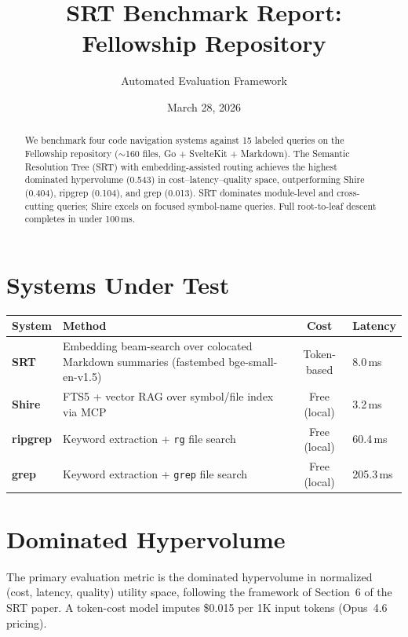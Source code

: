 \documentclass[11pt,a4paper]{article}
\title{\textbf{SRT Benchmark Report: Fellowship Repository}}
\author{Automated Evaluation Framework}
\date{March 28, 2026}
\begin{document}
\maketitle

\begin{abstract}
We benchmark four code navigation systems against 15 labeled queries on the Fellowship repository ($\sim$160 files, Go + SvelteKit + Markdown).
The Semantic Resolution Tree (SRT) with embedding-assisted routing achieves the highest dominated hypervolume (0.543) in cost--latency--quality space, outperforming Shire (0.404), ripgrep (0.104), and grep (0.013).
SRT dominates module-level and cross-cutting queries; Shire excels on focused symbol-name queries.
Full root-to-leaf descent completes in under 100\,ms.
\end{abstract}

\section{Systems Under Test}

\begin{table}[h]
\centering
\footnotesize
\begin{tabularx}{\textwidth}{lXcl}
\toprule
\textbf{System} & \textbf{Method} & \textbf{Cost} & \textbf{Latency} \\
\midrule
\textcolor{srtblue}{\textbf{SRT}} & Embedding beam-search over colocated Markdown summaries (fastembed bge-small-en-v1.5) & Token-based & 8.0\,ms \\
\textcolor{shirered}{\textbf{Shire}} & FTS5 + vector RAG over symbol/file index via MCP & Free (local) & 3.2\,ms \\
\textcolor{rgorange}{\textbf{ripgrep}} & Keyword extraction + \texttt{rg} file search & Free (local) & 60.4\,ms \\
\textcolor{grepgray}{\textbf{grep}} & Keyword extraction + \texttt{grep} file search & Free (local) & 205.3\,ms \\
\bottomrule
\end{tabularx}
\end{table}

\section{Dominated Hypervolume}

The primary evaluation metric is the dominated hypervolume in normalized (cost, latency, quality) utility space, following the framework of Section~6 of the SRT paper.
A token-cost model imputes \$0.015 per 1K input tokens (Opus~4.6 pricing).
\end{document}
